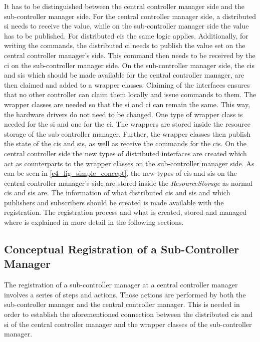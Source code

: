 It has to be distinguished between the central controller manager side and the sub-controller manager side. For the central controller manager side, a distributed \gls{si} needs to receive the value, while on the sub-controller manager side the value has to be published. For distributed \glspl{ci} the same logic applies. Additionally, for writing the commands, the distributed \gls{ci} needs to publish the value set on the central controller manager's side. This command then needs to be received by the \gls{ci} on the sub-controller manager side. On the sub-controller manager side, the \glspl{ci} and \glspl{si} which should be made available for the central controller manager, are then claimed and added to a wrapper classes. Claiming of the interfaces ensures that no other controller can claim them locally and issue commands to them. The wrapper classes are needed so that the \gls{si} and \gls{ci} can remain the same. This way, the hardware drivers do not need to be changed. One type of wrapper class is needed for the \gls{si} and one for the \gls{ci}.  The wrappers are stored inside the resource storage of the sub-controller manager. Further, the wrapper classes then publish the state of the \glspl{ci} and \glspl{si}, as well as receive the commands for the \glspl{ci}. On the central controller side the new types of distributed interfaces are created which act as counterparts to the wrapper classes on the sub-controller manager side. As can be seen in \autoref{c4_fig_simple_concept}, the new types of \glspl{ci} and \glspl{si} on the central controller manager's side are stored inside the \textit{ResourceStorage} as normal \glspl{ci} and \glspl{si} are.\newline 
The information of what distributed \glspl{ci} and \glspl{si} and which publishers and subscribers should be created is made available with the registration. The registration process and what is created, stored and managed where is explained in more detail in the following sections.

\subsection{Conceptual Registration of a Sub-Controller Manager}\label{c4_sec_registraion_csi}
The registration of a sub-controller manager at a central controller manager involves a series of steps and actions. Those actions are performed by both the sub-controller manager and the central controller manager. This is needed in order to establish the aforementioned connection between the distributed \glspl{ci} and \gls{si} of the central controller manager and the wrapper classes of the sub-controller manager.

